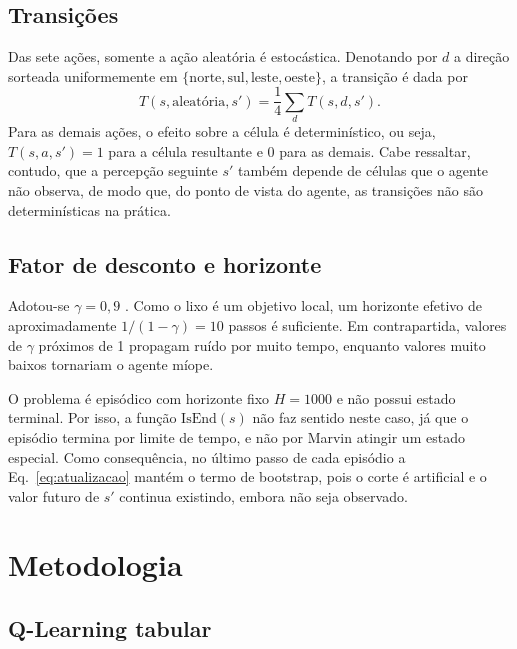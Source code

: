 \subsection{Transições}

Das sete ações, somente a ação aleatória é estocástica. Denotando por $d$ a direção sorteada uniformemente em $\{\text{norte}, \text{sul}, \text{leste}, \text{oeste}\}$, a transição é dada por
\begin{equation}
    T(s, \text{aleatória}, s') = \frac{1}{4} \sum_{d} T(s, d, s').
\end{equation}
Para as demais ações, o efeito sobre a célula é determinístico, ou seja, $T(s, a, s') = 1$ para a célula resultante e $0$ para as demais. Cabe ressaltar, contudo, que a percepção seguinte $s'$ também depende de células que o agente não observa, de modo que, do ponto de vista do agente, as transições não são determinísticas na prática.

\subsection{Fator de desconto e horizonte}

Adotou-se $\gamma = 0{,}9$ . Como o lixo é um objetivo local, um horizonte efetivo de aproximadamente $1/(1-\gamma) = 10$ passos é suficiente. Em contrapartida, valores de $\gamma$ próximos de 1 propagam ruído por muito tempo, enquanto valores muito baixos tornariam o agente míope.

O problema é episódico com horizonte fixo $H = 1000$ e não possui estado terminal. Por isso, a função $\text{IsEnd}(s)$ não faz sentido neste caso, já que o episódio termina por limite de tempo, e não por Marvin atingir um estado especial. Como consequência, no último passo de cada episódio a Eq.~\eqref{eq:atualizacao} mantém o termo de bootstrap, pois o corte é artificial e o valor futuro de $s'$ continua existindo, embora não seja observado.

\section{Metodologia}
\label{sec:metodologia}

\subsection{Q-Learning tabular}

